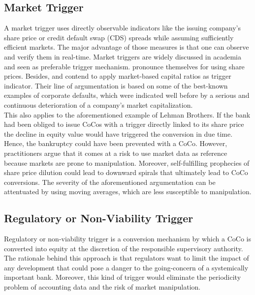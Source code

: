 \subsection{Market Trigger} \label{markettrigger}

A market trigger uses directly observable indicators like the issuing company's share price or credit default swap (CDS) spreads while assuming sufficiently efficient markets. The major advantage of those measures is that one can observe and verify them in real-time. \citep{haldane2011capital} Market triggers are widely discussed in academia and seen as preferable trigger mechanism. \citet{calomiris2013design} pronounce themselves for using share prices. Besides, \citet{haldane2011capital} and \citet{pazarbasioglu2011contingent} contend to apply market-based capital ratios as trigger indicator. Their line of argumentation is based on some of the best-known examples of corporate defaults, which were indicated well before by a serious and continuous deterioration of a company's market capitalization.\\ 

This also applies to the aforementioned example of Lehman Brothers. If the bank had been obliged to issue CoCos with a trigger directly linked to its share price the decline in equity value would have triggered the conversion in due time.\citep{calomiris2013design} Hence, the bankruptcy could have been prevented with a CoCo. However, practitioners argue that it comes at a risk to use market data as reference because markets are prone to manipulation. Moreover, self-fulfilling prophecies of share price dilution could lead to downward spirals that ultimately lead to CoCo conversions. \citep{pazarbasioglu2011contingent} The severity of the aforementioned argumentation can be attentuated by using moving averages, which are less susceptible to manipulation. 

\subsection{Regulatory or Non-Viability Trigger} \label{regulatorytrigger}

Regulatory or non-viability trigger is a conversion mechanism by which a CoCo is converted into equity at the discretion of the responsible supervisory authority. The rationale behind this approach is that regulators want to limit the impact of any development that could pose a danger to the going-concern of a systemically important bank.\citet{erismann2015pricing} Moreover, this kind of trigger would eliminate the periodicity problem of accounting data and the risk of market manipulation.\\ 

